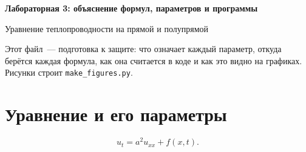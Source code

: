 \documentclass[a4paper,12pt]{article}
\newcommand{\code}[1]{\texttt{#1}}
\begin{document}
\begin{center}
  {\Large\bfseries Лабораторная 3: объяснение формул, параметров и программы\par}
  \vspace{4pt}
  {Уравнение теплопроводности на прямой и полупрямой\par}
\end{center}

Этот файл~--- подготовка к защите: что означает каждый параметр, откуда берётся
каждая формула, как она считается в коде и как это видно на графиках. Рисунки
строит \code{make\_figures.py}.

\tableofcontents

\section{Уравнение и его параметры}

\begin{equation}\label{eq:heat}
  u_t=a^2u_{xx}+f(x,t).
\end{equation}
\end{document}
